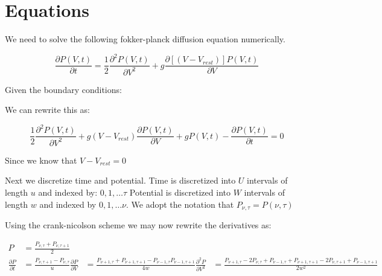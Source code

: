 \documentclass[10pt]{article}
\begin{document}
 

\section{Equations}

We need to solve the following fokker-planck diffusion equation
numerically.

\begin{equation}
    \frac{\partial P(V,t)}{\partial t} =
    \frac{1}{2} \frac{\partial^2 P(V,t) } {\partial V^2} +
    g\frac{\partial[(V-V_{rest})]P(V,t)}{\partial V}
\end{equation}

Given the boundary conditions:

We can rewrite this as:

\begin{equation}
    \frac{1}{2} \frac{\partial^2 P(V,t) } {\partial V^2} +
    g(V-V_{rest})\frac{\partial P(V,t)}{\partial V} +
    gP(V,t) -
    \frac{\partial P(V,t)}{\partial t} = 
    0
\end{equation}

Since we know that $ V-V_{rest} = 0 $

Next we discretize time and potential. Time is discretized  into $U$
intervals of length $u$ and indexed by: $ 0,1, \dots \tau $ Potential
is discretized into $W$ intervals of length $w$ and indexed by $ 0,1,
\dots \nu $. We adopt the notation that $P_{\nu,\tau} = P(\nu,\tau)$ 

Using the crank-nicolson scheme we  may now rewrite the derivatives as:

\begin{align*}

    P &= \frac{P_{\nu,\tau} + P_{\nu,\tau + 1}}{2} \\


    \frac{\partial P}{\partial t} &= \frac{P_{\nu,\tau +1 } - P_{\nu,\tau}}{u} 


    \frac{\partial P}{\partial V} &= 
    \frac{P_{\nu +1,\tau } + P_{\nu +1,\tau +1 } -
    P_{\nu - 1,\tau } P_{\nu -1,\tau +1}} 
    {4w}


    \frac{\partial^2 P}{\partial V^2} &= 
    \frac{P_{\nu+1,\tau} - 2 P_{\nu,\tau} + P_{\nu-1,\tau} +
    P_{\nu+1,\tau+1} - 2 P_{\nu,\tau+1} + P_{\nu-1,\tau+1}}
    {2w^2} 

\end{align*}
\end{document}
